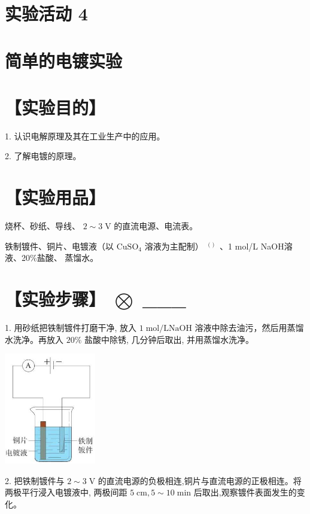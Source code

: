 \documentclass[10pt]{article}
\begin{document}
\section*{实验活动 4}

\section*{简单的电镀实验}

\section*{【实验目的】}

1. 认识电解原理及其在工业生产中的应用。

2. 了解电镀的原理。

\section*{【实验用品】}

烧杯、砂纸、导线、 \(2 \sim 3\mathrm{\;V}\) 的直流电源、电流表。

铁制镀件、铜片、电镀液（以 \({\mathrm{{CuSO}}}_{4}\) 溶液为主配制） \({}^{\text{ ( ) }}\) 、1 mol/L NaOH溶液、20\%盐酸、 蒸馏水。

\section*{【实验步骤】 \(\bigotimes\) \_\_\_}

1. 用砂纸把铁制镀件打磨干净, 放入 \(1\mathrm{\;{mol}}/\mathrm{L}\mathrm{{NaOH}}\) 溶液中除去油污，然后用蒸馏水洗净。再放入 \({20}\%\) 盐酸中除锈, 几分钟后取出, 并用蒸馏水洗净。

\begin{center}
\includegraphics[max width=0.3\textwidth]{images/0190da9d-8bfd-732f-bc2c-0b21d0f13b91_127_351529.jpg}
\end{center}

2. 把铁制镀件与 \(2 \sim 3\mathrm{\;V}\) 的直流电源的负极相连,铜片与直流电源的正极相连。将两极平行浸入电镀液中, 两极间距 \(5\mathrm{\;{cm}},5 \sim {10}\mathrm{\;{min}}\) 后取出,观察镀件表面发生的变化。
\end{document}
